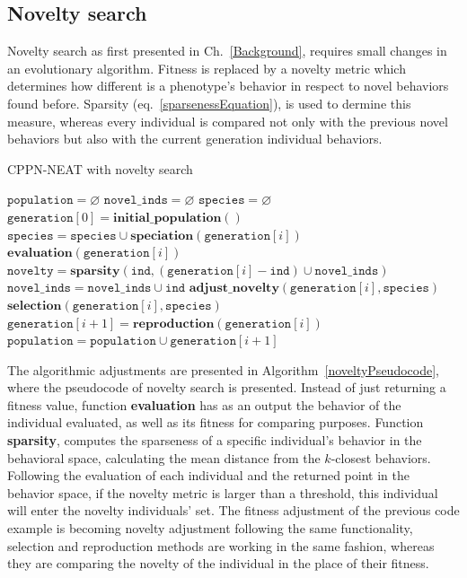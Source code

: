 \subsection{Novelty search}
Novelty search as first presented in Ch.~\ref{Background}, requires small changes in an evolutionary algorithm. Fitness is replaced by a novelty metric which determines how different is a phenotype's behavior in respect to novel behaviors found before. Sparsity (eq.~\ref{sparsenessEquation}), is used to dermine this measure, whereas every individual is compared not only with the previous novel behaviors but also with the current generation individual behaviors. 



\begin{algorithm}[t!]
\caption{CPPN-NEAT with novelty search}
\label{noveltyPseudocode}
\begin{algorithmic}[1]
\STATE $\mathtt{population} = \varnothing$
\STATE $\mathtt{novel\_inds} = \varnothing$
\STATE $\mathtt{species} = \varnothing$
\STATE $\mathtt{generation}[0] = \mathbf{initial\_population}()$
\STATE $\mathtt{species} = \mathtt{species} \cup \mathbf{speciation}(\mathtt{generation}[i])$
\STATE $\mathbf{evaluation}(\mathtt{generation}[i])$
\STATE $\mathtt{novelty} = \mathbf{sparsity}(\mathtt{ind}, (\mathtt{generation}[i] - \mathtt{ind}) \cup \mathtt{novel\_inds})$
\STATE $\mathtt{novel\_inds} = \mathtt{novel\_inds} \cup \mathtt{ind}$
\ENDIF
\ENDFOR
\STATE $\mathbf{adjust\_novelty}(\mathtt{generation}[i], \mathtt{species})$
\STATE $\mathbf{selection}(\mathtt{generation}[i], \mathtt{species})$
\STATE $\mathtt{generation}[i+1] = \mathbf{reproduction}(\mathtt{generation}[i])$
\STATE $\mathtt{population} = \mathtt{population} \cup \mathtt{generation}[i+1]$
\ENDFOR
\end{algorithmic}
\end{algorithm}


The algorithmic adjustments are presented in Algorithm~\ref{noveltyPseudocode}, where the pseudocode of novelty search is presented. Instead of just returning a fitness value, function \textbf{evaluation} has as an output the behavior of the individual evaluated, as well as its fitness for comparing purposes. Function \textbf{sparsity}, computes the sparseness of a specific individual's behavior in the behavioral space, calculating the mean distance from the $k$-closest behaviors. Following the evaluation of each individual and the returned point in the behavior space, if the novelty metric is larger than a threshold, this individual will enter the novelty individuals' set. The fitness adjustment of the previous code example is becoming novelty adjustment following the same functionality, selection and reproduction methods are working in the same fashion, whereas they are comparing the novelty of the individual in the place of their fitness.


